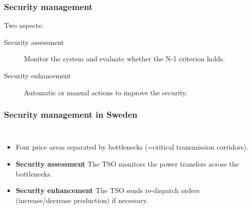 \documentclass{beamer}
\begin{document}
\begin{frame}
  \frametitle{Security management}
  Two aspects:
  \begin{description}
  \item[Security assessment] Monitor the system and evaluate whether the N-1 criterion holds.
  \item[Security enhancement] Automatic or manual actions to improve the security.
  \end{description}
\end{frame}

\begin{frame}
  \frametitle{Security management in Sweden}
  \begin{columns}
    \begin{itemize}
    \item Four price areas separated by bottlenecks (=critical transmission corridors).
    \item \textbf{Security assessment} The TSO monitors the power transfers across the bottlenecks. 
    \item \textbf{Security enhancement} The TSO sends re-dispatch orders (increase/decrease production) if necessary.
    \end{itemize}
  \end{columns}
\end{frame}
\end{document}
